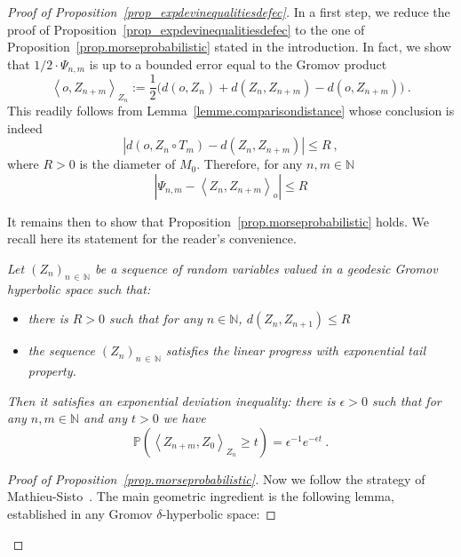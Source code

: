 \documentclass[AHL,Unicode,longabstracts,published]{cedram}
\newcommand{\bP}{\mathbb{P}}
\newcommand{\NN}{\mathbb{N}}
\begin{document}
\begin{proof}[{Proof of Proposition~\ref{prop_expdevinequalitiesdefec}}]
In a first step, we reduce the proof of Proposition~\ref{prop_expdevinequalitiesdefec} to the one of Proposition~\ref{prop.morseprobabilistic} stated in the introduction. In fact, we show that $1/2 \cdot \Psi_{n,m}$ is up to a bounded error equal to the Gromov product
\[
\left\langle o, Z_{n+m} \right\rangle_{Z_n} := \frac{1}{2} \big(d(o,Z_n) + d\left(Z_n,Z_{n+m}\right) -d\left(o,Z_{n+m}\right) \big) \ .
\]
This readily follows from Lemma~\ref{lemme.comparisondistance} whose conclusion is indeed
\[
\left|d\left(o,Z_n \circ T_m\right) -d\left(Z_n,Z_{n+m}\right) \right| \le R \ ,
\]
where $R>0$ is the diameter of $M_0$. Therefore, for any $n,m \in \NN$
\begin{equation}\label{eq.Psi is at bounded distance of gromov product}
\left|\Psi_{n,m} - \left\langle Z_n, Z_{n+m}\right\rangle_{o} \right|\leq R
\end{equation}

It remains then to show that Proposition~\ref{prop.morseprobabilistic} holds. We recall here its statement for the reader's convenience. 

\emph{Let $(Z_n)_{n\,\in\,\NN}$ be a sequence of random variables valued in a geodesic Gromov hyperbolic space such that:}
\begin{itemize}
\item \emph{there is $R > 0$ such that for any $n \in \NN$, $d(Z_n, Z_{n+1}) \le R$}
\item \emph{the sequence $(Z_n)_{n\,\in\,\NN}$ satisfies the linear progress with exponential tail property.}
\end{itemize}
\emph{Then it satisfies an exponential deviation inequality: there is $\epsilon > 0$ such that for any $ n,m \in \NN$ and any $t > 0$ we have}
\[
\bP\left(\left<Z_{n+m},Z_0 \right>_{Z_n} \geq t\right) = \epsilon^{-1} e^{-\epsilon t} \ .
\]

\begin{proof}[{Proof of Proposition~\ref{prop.morseprobabilistic}}]
Now we follow the strategy of Mathieu-Sisto~\cite[Section~11]{artmathieusisto}. The main geometric ingredient is the following lemma, established in any Gromov $\delta$-hyperbolic space:


\end{proof}
\end{proof}
\end{document}
